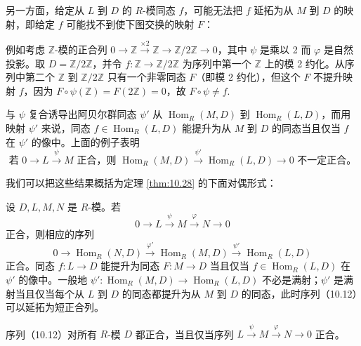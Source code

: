 另一方面，给定从 \(L\) 到 \(D\) 的 \(R\)-模同态 \(f\)，可能无法把 \(f\) 延拓为从 \(M\) 到 \(D\) 的映射，即给定 \(f\) 可能找不到使下图交换的映射 \(F\)：
\begin{center}\end{center}
例如考虑 \(\mathbb{Z}\)-模的正合列 \(0 \to \mathbb{Z} \xrightarrow{\times 2} \mathbb{Z} \to \mathbb{Z}/2\mathbb{Z} \to 0\)，其中 \(\psi\) 是乘以 2 而 \(\varphi\) 是自然投影。取 \(D = \mathbb{Z}/2\mathbb{Z}\)，并令 \(f : \mathbb{Z} \to \mathbb{Z}/2\mathbb{Z}\) 为序列中第一个 \(\mathbb{Z}\) 上的模 2 约化。从序列中第二个 \(\mathbb{Z}\) 到 \(\mathbb{Z}/2\mathbb{Z}\) 只有一个非零同态 \(F\)（即模 2 约化），但这个 \(F\) 不提升映射 \(f\)，因为 \(F \circ \psi(\mathbb{Z}) = F(2\mathbb{Z}) = 0\)，故 \(F \circ \psi \neq f\).

与 \(\psi\) 复合诱导出阿贝尔群同态 \(\psi'\) 从 \(\operatorname{Hom}_R(M, D)\) 到 \(\operatorname{Hom}_R(L, D)\)，而用映射 \(\psi'\) 来说，同态 \(f \in \operatorname{Hom}_R(L, D)\) 能提升为从 \(M\) 到 \(D\) 的同态当且仅当 \(f\) 在 \(\psi'\) 的像中。上面的例子表明
\[
\text{若 } 0 \to L \xrightarrow{\psi} M \text{ 正合，则 } \operatorname{Hom}_R(M, D) \xrightarrow{\psi'} \operatorname{Hom}_R(L, D) \to 0 \text{ 不一定正合}。
\]

我们可以把这些结果概括为定理 \ref{thm:10.28} 的下面对偶形式：

\begin{theorem}\label{thm:10.33}
设 \(D, L, M, N\) 是 \(R\)-模。若
\[
0 \longrightarrow L \xrightarrow{\ \psi\ } M \xrightarrow{\ \varphi\ } N \longrightarrow 0
\]
正合，则相应的序列
\begin{equation}
0 \longrightarrow \operatorname{Hom}_R(N, D) \xrightarrow{\ \varphi'\ } \operatorname{Hom}_R(M, D) \xrightarrow{\ \psi'\ } \operatorname{Hom}_R(L, D) \tag{10.12}
\end{equation}
正合。同态 \(f : L \to D\) 能提升为同态 \(F : M \to D\) 当且仅当 \(f \in \operatorname{Hom}_R(L, D)\) 在 \(\psi'\) 的像中。一般地 \(\psi' : \operatorname{Hom}_R(M, D) \to \operatorname{Hom}_R(L, D)\) 不必是满射；\(\psi'\) 是满射当且仅当每个从 \(L\) 到 \(D\) 的同态都提升为从 \(M\) 到 \(D\) 的同态，此时序列（10.12）可以延拓为短正合列。

序列（10.12）对所有 \(R\)-模 \(D\) 都正合，当且仅当序列 \(L \xrightarrow{\psi} M \xrightarrow{\varphi} N \to 0\) 正合。
\end{theorem}

